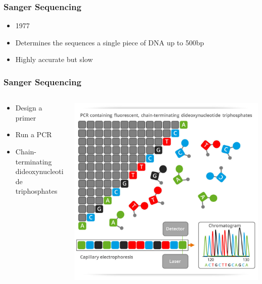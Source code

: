 \documentclass[14pt]{beamer}
\begin{document}
\begin{frame}
\frametitle{Sanger Sequencing}
\begin{itemize}
	\item 1977
	\item Determines the sequences a single piece of DNA up to 500bp
	\item Highly accurate but slow
\end{itemize}
\end{frame}

\begin{frame}
\frametitle{Sanger Sequencing}
\begin{columns}
	\begin{column}{0.5\textwidth}
		\begin{itemize}
			\item Design a primer
			\item Run a PCR
			\item Chain-terminating dideoxynucleotide triphosphates
		\end{itemize}
	\end{column}
	\begin{column}{0.5\textwidth}
    	\begin{center}
     		\includegraphics[width=1\textwidth]{images_20170905_sanger.jpg}
     	\end{center}
		\end{column}
	\end{columns}
\end{frame}
\end{document}
